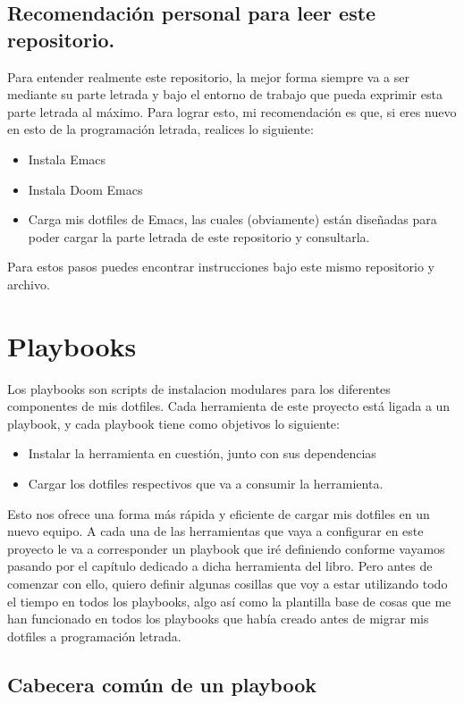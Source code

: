 \documentclass[11pt]{article}
\begin{document}
\subsection{Recomendación personal para leer este repositorio.}
\label{sec:org5e6cdac}
Para entender realmente este repositorio, la mejor forma siempre va a ser mediante su parte letrada y bajo el entorno de trabajo que pueda exprimir esta parte letrada al máximo. Para lograr esto, mi recomendación es que, si eres nuevo en esto de la programación letrada, realices lo siguiente:

\begin{itemize}
\item Instala Emacs
\item Instala Doom Emacs
\item Carga mis dotfiles de Emacs, las cuales (obviamente) están diseñadas para poder cargar la parte letrada de este repositorio y consultarla.
\end{itemize}

Para estos pasos puedes encontrar instrucciones bajo este mismo repositorio y archivo.
\section{Playbooks}
\label{sec:orgccafd44}

Los playbooks son scripts de instalacion modulares para los diferentes componentes de mis dotfiles. Cada herramienta de este proyecto está ligada a un playbook, y cada playbook tiene como objetivos lo siguiente:

\begin{itemize}
\item Instalar la herramienta en cuestión, junto con sus dependencias
\item Cargar los dotfiles respectivos que va a consumir la herramienta.
\end{itemize}

Esto nos ofrece una forma más rápida y eficiente de cargar mis dotfiles en un nuevo equipo. A cada una de las herramientas que vaya a configurar en este proyecto le va a corresponder un playbook que iré definiendo conforme vayamos pasando por el capítulo dedicado a dicha herramienta del libro. Pero antes de comenzar con ello, quiero definir algunas cosillas que voy a estar utilizando todo el tiempo en todos los playbooks, algo así como la plantilla base de cosas que me han funcionado en todos los playbooks que había creado antes de migrar mis dotfiles a programación letrada.
\subsection{Cabecera común de un playbook}
\label{sec:org11cbbb2}
\end{document}
